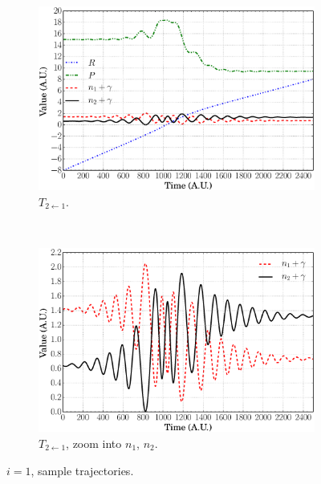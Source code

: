 \documentclass[xetex,mathserif,serif]{beamer}
\newcommand{\tto}{$ T_{2\leftarrow1} $}
\begin{document}
\begin{frame}
{\begin{figure}
\begin{subfigure}[t]{0.45\textwidth}
\includegraphics[width=\textwidth]{dc_traj_t21.eps}
\vspace{-0.1cm}
\caption{{\fontsize{7}{8}\selectfont \tto.}}
\end{subfigure}
~
\begin{subfigure}[t]{0.45\textwidth}
\centering
\includegraphics[width=\textwidth]{dc_traj_t21_e.eps}
\vspace{-0.1cm}
\caption{{\fontsize{7}{8}\selectfont \tto, zoom into $ n_{1}$, $n_{2} $.}}
\end{subfigure}
\vspace{-0.1cm}
\caption{$ i = 1 $, sample trajectories.}
\end{figure}
}{}


\end{frame}
\end{document}

